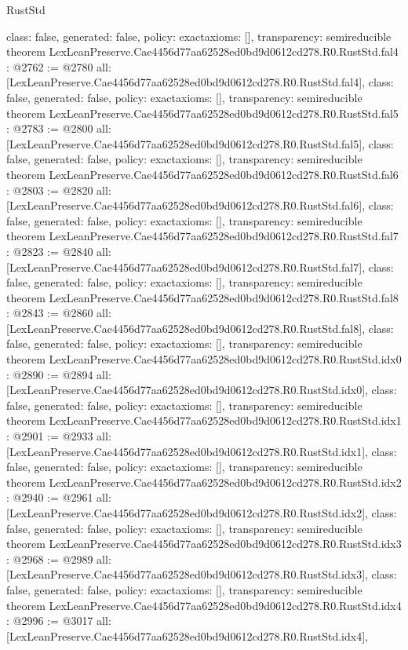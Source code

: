 \begin{lexlean}{RustStd}
\begin{coremodule}
{  class: false,
  generated: false,
  policy: exact{axioms: []},
  transparency: semireducible
}
theorem LexLeanPreserve.Cae4456d77aa62528ed0bd9d0612cd278.R0.RustStd.fal4 : @2762 := @2780 {
  all: [LexLeanPreserve.Cae4456d77aa62528ed0bd9d0612cd278.R0.RustStd.fal4],
  class: false,
  generated: false,
  policy: exact{axioms: []},
  transparency: semireducible
}
theorem LexLeanPreserve.Cae4456d77aa62528ed0bd9d0612cd278.R0.RustStd.fal5 : @2783 := @2800 {
  all: [LexLeanPreserve.Cae4456d77aa62528ed0bd9d0612cd278.R0.RustStd.fal5],
  class: false,
  generated: false,
  policy: exact{axioms: []},
  transparency: semireducible
}
theorem LexLeanPreserve.Cae4456d77aa62528ed0bd9d0612cd278.R0.RustStd.fal6 : @2803 := @2820 {
  all: [LexLeanPreserve.Cae4456d77aa62528ed0bd9d0612cd278.R0.RustStd.fal6],
  class: false,
  generated: false,
  policy: exact{axioms: []},
  transparency: semireducible
}
theorem LexLeanPreserve.Cae4456d77aa62528ed0bd9d0612cd278.R0.RustStd.fal7 : @2823 := @2840 {
  all: [LexLeanPreserve.Cae4456d77aa62528ed0bd9d0612cd278.R0.RustStd.fal7],
  class: false,
  generated: false,
  policy: exact{axioms: []},
  transparency: semireducible
}
theorem LexLeanPreserve.Cae4456d77aa62528ed0bd9d0612cd278.R0.RustStd.fal8 : @2843 := @2860 {
  all: [LexLeanPreserve.Cae4456d77aa62528ed0bd9d0612cd278.R0.RustStd.fal8],
  class: false,
  generated: false,
  policy: exact{axioms: []},
  transparency: semireducible
}
theorem LexLeanPreserve.Cae4456d77aa62528ed0bd9d0612cd278.R0.RustStd.idx0 : @2890 := @2894 {
  all: [LexLeanPreserve.Cae4456d77aa62528ed0bd9d0612cd278.R0.RustStd.idx0],
  class: false,
  generated: false,
  policy: exact{axioms: []},
  transparency: semireducible
}
theorem LexLeanPreserve.Cae4456d77aa62528ed0bd9d0612cd278.R0.RustStd.idx1 : @2901 := @2933 {
  all: [LexLeanPreserve.Cae4456d77aa62528ed0bd9d0612cd278.R0.RustStd.idx1],
  class: false,
  generated: false,
  policy: exact{axioms: []},
  transparency: semireducible
}
theorem LexLeanPreserve.Cae4456d77aa62528ed0bd9d0612cd278.R0.RustStd.idx2 : @2940 := @2961 {
  all: [LexLeanPreserve.Cae4456d77aa62528ed0bd9d0612cd278.R0.RustStd.idx2],
  class: false,
  generated: false,
  policy: exact{axioms: []},
  transparency: semireducible
}
theorem LexLeanPreserve.Cae4456d77aa62528ed0bd9d0612cd278.R0.RustStd.idx3 : @2968 := @2989 {
  all: [LexLeanPreserve.Cae4456d77aa62528ed0bd9d0612cd278.R0.RustStd.idx3],
  class: false,
  generated: false,
  policy: exact{axioms: []},
  transparency: semireducible
}
theorem LexLeanPreserve.Cae4456d77aa62528ed0bd9d0612cd278.R0.RustStd.idx4 : @2996 := @3017 {
  all: [LexLeanPreserve.Cae4456d77aa62528ed0bd9d0612cd278.R0.RustStd.idx4],
}
\end{coremodule}
\end{lexlean}
